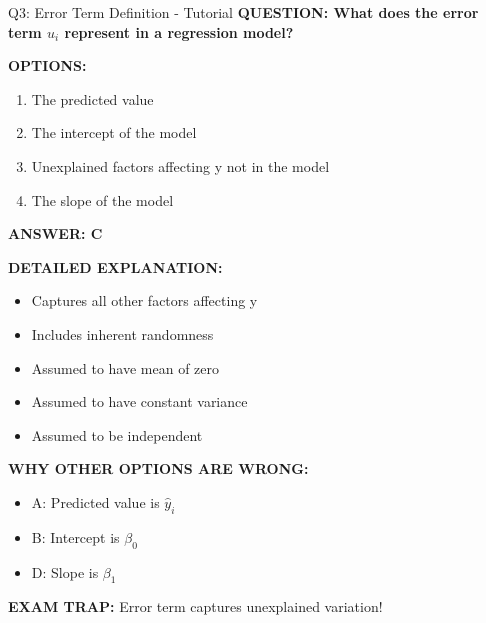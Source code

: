 \documentclass[8pt]{beamer}
\begin{document}
	
	\begin{frame}{Q3: Error Term Definition - Tutorial}
		\fontsize{6.5}{7.5}\selectfont
		\textbf{QUESTION: What does the error term $u_i$ represent in a regression model?}
		
		\vspace{0.1cm}
		\textbf{OPTIONS:}
		\begin{enumerate}
			\item The predicted value
			\item The intercept of the model
			\item Unexplained factors affecting y not in the model
			\item The slope of the model
		\end{enumerate}
		
		\vspace{0.1cm}
		\textcolor{myblue}{\textbf{ANSWER: C}}
		
		\vspace{0.1cm}
		\textbf{DETAILED EXPLANATION:}
		\begin{itemize}
			\item Captures all other factors affecting y
			\item Includes inherent randomness
			\item Assumed to have mean of zero
			\item Assumed to have constant variance
			\item Assumed to be independent
		\end{itemize}
		
		\vspace{0.1cm}
		\textcolor{myred}{\textbf{WHY OTHER OPTIONS ARE WRONG:}}
		\begin{itemize}
			\item \textcolor{myred}{A:} Predicted value is $\hat{y}_i$
			\item \textcolor{myred}{B:} Intercept is $\beta_0$
			\item \textcolor{myred}{D:} Slope is $\beta_1$
		\end{itemize}
		
		\textcolor{myred}{\textbf{EXAM TRAP:}} Error term captures \textcolor{myblue}{unexplained variation}!
	\end{frame}
	
\end{document}
